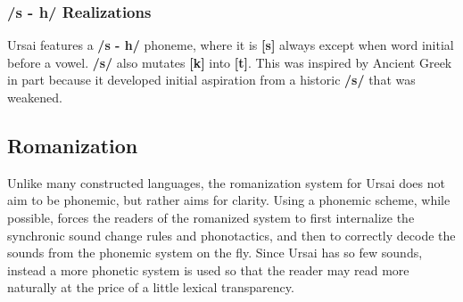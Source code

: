 \documentclass[11pt,letterpaper]{article}
\begin{document}
		\subsubsection{/s - h/ Realizations}
		\par
		Ursai features a \textbf{/s - h/} phoneme, where it is \textbf{[s]} always except when word initial before a vowel.  \textbf{/s/} also mutates \textbf{[k]} into \textbf{[t]}.  This was inspired by Ancient Greek\cite{GreekPhonology} in part because it developed initial aspiration from a historic \textbf{/s/} that was weakened.
	\subsection{Romanization}
		\par 
		Unlike many constructed languages, the romanization system for Ursai does not aim to be phonemic, but rather aims for clarity.  Using a phonemic scheme, while possible, forces the readers of the romanized system to first internalize the synchronic sound change rules and phonotactics, and then to correctly decode the sounds from the phonemic system on the fly.  Since Ursai has so few sounds, instead a more phonetic system is used so that the reader may read more naturally at the price of a little lexical transparency.
		\pagebreak
\end{document}
